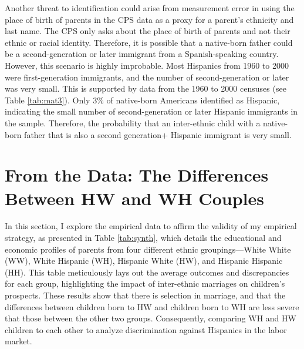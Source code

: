 Another threat to identification could arise from measurement error in using the place of birth of parents in the CPS data as a proxy for a parent's ethnicity and last name. The CPS only asks about the place of birth of parents and not their ethnic or racial identity. Therefore, it is possible that a native-born father could be a second-generation or later immigrant from a Spanish-speaking country. However, this scenario is highly improbable. Most Hispanics from 1960 to 2000 were first-generation immigrants, and the number of second-generation or later was very small. This is supported by data from the 1960 to 2000 censuses (see Table \ref{tab:mat3}). Only 3\% of native-born Americans identified as Hispanic, indicating the small number of second-generation or later Hispanic immigrants in the sample. Therefore, the probability that an inter-ethnic child with a native-born father that is also a second generation+ Hispanic immigrant is very small.

\section{From the Data: The Differences Between HW and WH Couples}\label{sec:hw-wh-couples-data}

In this section, I explore the empirical data to affirm the validity of my empirical strategy, as presented in Table \ref{tab:synth}, which details the educational and economic profiles of parents from four different ethnic groupings—White White (WW), White Hispanic (WH), Hispanic White (HW), and Hispanic Hispanic (HH). This table meticulously lays out the average outcomes and discrepancies for each group, highlighting the impact of inter-ethnic marriages on children's prospects. These results show that there is selection in marriage, and that the differences between children born to HW and children born to WH are less severe that those between the other two groups. Consequently, comparing WH and HW children to each other to analyze discrimination against Hispanics in the labor market.

